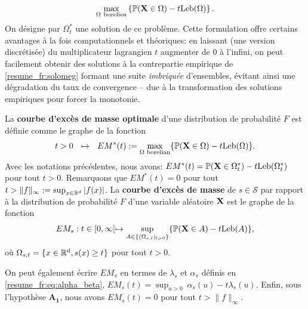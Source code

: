 \begin{equation}
\label{resume_fr:solomeg}
\max_{\Omega~ \text{borelien}}  \left\{ \mathbb{P}(\mathbf X \in \Omega) - t \text{Leb}(\Omega) \right\}.
\end{equation}
On désigne par $ \Omega ^ * _ t $ une solution de ce problème. Cette formulation offre certains avantages à la fois computationnels et théoriques: en laissant (une version discrétisée) du multiplicateur lagrangien $ t $ augmenter de $ 0 $ à l'infini, on peut facilement obtenir des solutions à la contrepartie empirique de \eqref{resume_fr:solomeg} formant une suite \textit {imbriquée} d'ensembles, évitant ainsi une dégradation du taux de convergence -- due à la transformation des solutions empiriques pour forcer la monotonie.

%
La \textbf{courbe d'excès de masse optimale} d'une distribution de probabilité  $F$ est définie comme le graphe de la fonction
$$t>0~~\mapsto~~ EM^*(t):=\max_{\Omega\text{ borelian} } \{ {\mathbb{P}} (\mathbf X\in \Omega)-t\text{Leb}(\Omega) \}.$$ 
Avec les notations précédentes, nous avons: $EM^*(t)=\mathbb{P}(\mathbf X \in \Omega_t^*)-t \text{Leb}(\Omega_t^*)$ pour tout $t>0$.
Remarquons que $EM^*(t) = 0$ pour tout $t>\|f\|_\infty:=\sup_{x\in \mathbb{R}^d}\vert f(x)\vert$. 
%
  La \textbf{courbe d'excès de masse} de $s\in\mathcal{S}$ par rapport à la distribution de probabilité $F$ d'une variable aléatoire $\mathbf X$ est le graphe de la fonction
\begin{equation}
\label{resume_fr:EM}
EM_s : t \in [0, \infty[ \mapsto \sup_{A \in \{(\Omega_{s,l})_{l>0}\}}\{ {\mathbb{P}}(\mathbf X \in A) - t \text{Leb}(A)\},
\end{equation}
où $\Omega_{s,t}=\{ x \in \mathbb{R}^d, s(x) \ge t \}$ pour tout $t>0$.

On peut également écrire $ EM_s $ en termes de $ \lambda_s $ et $ \alpha_s $ définis en \eqref{resume_fr:eq:alpha_beta}, $EM_s(t)= \sup_{u>0}~ \alpha_s(u) -t \lambda_s(u) $. Enfin, sous l'hypothèse $ \mathbf {A_1} $, nous avons $ EM_s (t) = 0 $ pour tout $t> \|f\|_\infty$.

